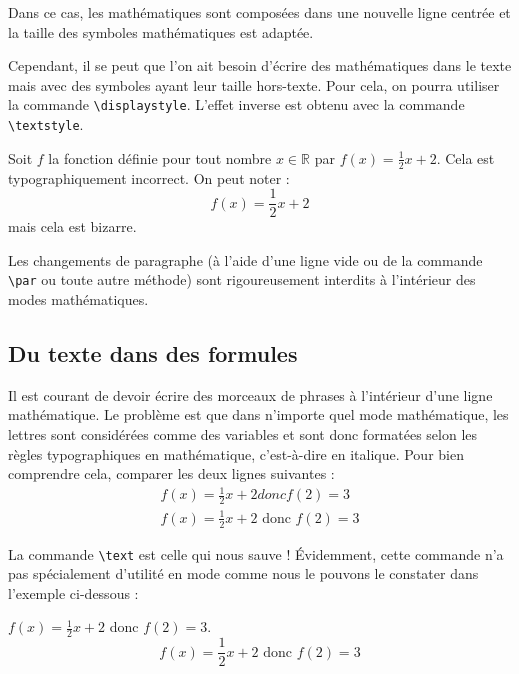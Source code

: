 Dans ce cas, les mathématiques sont composées dans une nouvelle ligne centrée et la taille des symboles mathématiques est adaptée.

Cependant, il se peut que l'on ait besoin d'écrire des mathématiques dans le texte mais avec des symboles ayant leur taille hors-texte. Pour cela, on pourra utiliser la commande \texttt{\textbackslash displaystyle}. L'effet inverse est obtenu avec la commande \texttt{\textbackslash textstyle}.\bigskip

{
\begin{SideBySideExample}
    Soit $f$ la fonction d\'efinie pour tout nombre
    $x \in \mathds R$ par
    $\displaystyle{f(x) = \frac 12 x + 2}$.
    Cela est typographiquement incorrect. On peut noter :
    \[\textstyle{f(x) = \frac 12 x + 2}\]
    mais cela est bizarre.
\end{SideBySideExample}
}\bigskip

\begin{info}
    Les changements de paragraphe (à l'aide d'une ligne vide ou de la commande \texttt{\textbackslash par} ou toute autre méthode) sont rigoureusement interdits à l'intérieur des modes mathématiques.
\end{info}

\subsection{Du texte dans des formules}

Il est courant de devoir écrire des morceaux de phrases à l'intérieur d'une ligne mathématique. Le problème est que dans n'importe quel mode mathématique, les lettres sont considérées comme des variables et sont donc formatées selon les règles typographiques en mathématique, c'est-à-dire en italique. Pour bien comprendre cela, comparer les deux lignes suivantes :
\[\begin{array}{c}
  	f(x) = \frac 12 x + 2 donc f(2) = 3 \\[10pt]
  	f(x) = \frac 12 x + 2 \text{ donc } f(2) = 3
  \end{array}\]

La commande \texttt{\textbackslash text} est celle qui nous sauve ! \'Evidemment, cette commande n'a pas spécialement d'utilité en mode  comme nous le pouvons le constater dans l'exemple ci-dessous :\bigskip

{
\begin{SideBySideExample}
    $f(x) = \frac 12 x + 2$ donc $f(2) = 3$.
    \[f(x) = \frac 12 x + 2 \text{ donc } f(2) = 3\]
\end{SideBySideExample}
}\bigskip

